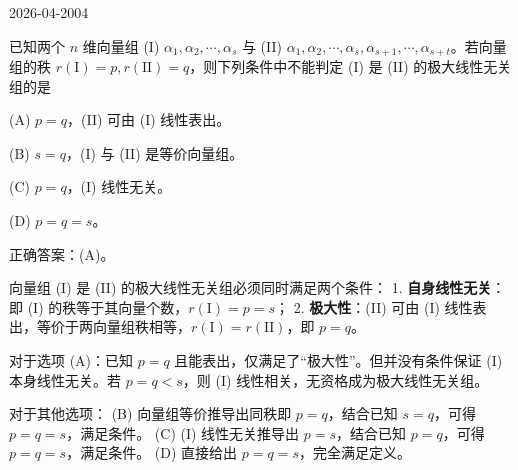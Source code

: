 \begin{mistake}{2026-04-20}{04}

\begin{problemcontent}
已知两个 \(n\) 维向量组 (I) \(\alpha_1, \alpha_2, \cdots, \alpha_s\) 与 (II) \(\alpha_1, \alpha_2, \cdots, \alpha_s, \alpha_{s+1}, \cdots, \alpha_{s+t}\)。若向量组的秩 \(r(\mathrm{I}) = p, r(\mathrm{II}) = q\)，则下列条件中不能判定 (I) 是 (II) 的极大线性无关组的是

(A) \(p=q\)，(II) 可由 (I) 线性表出。

(B) \(s=q\)，(I) 与 (II) 是等价向量组。

(C) \(p=q\)，(I) 线性无关。

(D) \(p=q=s\)。
\end{problemcontent}

\begin{solutioncontent}
正确答案：(A)。

向量组 (I) 是 (II) 的极大线性无关组必须同时满足两个条件：
1. \textbf{自身线性无关}：即 (I) 的秩等于其向量个数，\(r(\mathrm{I}) = p = s\)；
2. \textbf{极大性}：(II) 可由 (I) 线性表出，等价于两向量组秩相等，\(r(\mathrm{I}) = r(\mathrm{II})\)，即 \(p = q\)。

对于选项 (A)：已知 \(p=q\) 且能表出，仅满足了“极大性”。但并没有条件保证 (I) 本身线性无关。若 \(p = q < s\)，则 (I) 线性相关，无资格成为极大线性无关组。

对于其他选项：
(B) 向量组等价推导出同秩即 \(p=q\)，结合已知 \(s=q\)，可得 \(p=q=s\)，满足条件。
(C) (I) 线性无关推导出 \(p=s\)，结合已知 \(p=q\)，可得 \(p=q=s\)，满足条件。
(D) 直接给出 \(p=q=s\)，完全满足定义。
\end{solutioncontent}


\end{mistake}
